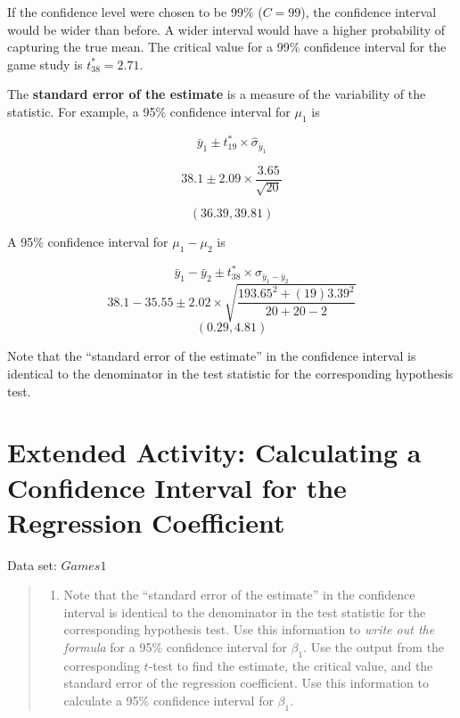 \documentclass[
]{report}
\providecommand{\tightlist}{%
  \setlength{\itemsep}{0pt}\setlength{\parskip}{0pt}}
\begin{document}
If the confidence level were chosen to be 99\% (\(C = 99\)), the confidence interval would be wider than before. A wider interval would have a higher probability of capturing the true mean. The critical value for a 99\% confidence interval for the game study is \(t^*_{38} = 2.71\).

The \textbf{standard error of the estimate} is a measure of the variability of the statistic. For example, a 95\% confidence interval for \(\mu_1\) is

\[
\bar{y}_1 \pm t^*_{19} \times \hat{\sigma}_{\bar{y}_1}
\]

\[
38.1 \pm 2.09 \times \frac{3.65}{\sqrt{20}}
\]

\[
(36.39, 39.81)
\]

A 95\% confidence interval for \(\mu_1 - \mu_2\) is

\[
\bar{y}_1 - \bar{y}_2 \pm t^*_{38} \times \hat{\sigma}_{\bar{y}_1 - \bar{y}_2}
\]
\[
38.1 - 35.55 \pm 2.02 \times \sqrt{ \frac{193.65^2 + (19)3.39^2}{20 + 20 - 2} }
\]
\[
(0.29, 4.81)
\]

Note that the ``standard error of the estimate'' in the confidence interval is identical to the denominator in the test statistic for the corresponding hypothesis test.

\hypertarget{extended-activity-calculating-a-confidence-interval-for-the-regression-coefficient}{%
\section*{Extended Activity: Calculating a Confidence Interval for the Regression Coefficient}\label{extended-activity-calculating-a-confidence-interval-for-the-regression-coefficient}}

Data set: \(Games1\)

\begin{quote}
\begin{enumerate}
\def\labelenumi{\arabic{enumi}.}
\setcounter{enumi}{39}
\tightlist
\item
  Note that the ``standard error of the estimate'' in the confidence interval is identical to the denominator in the test statistic for the corresponding hypothesis test. Use this information to \emph{write out the formula} for a 95\% confidence interval for \(\beta_1\). Use the output from the corresponding \(t\)-test to find the estimate, the critical value, and the standard error of the regression coefficient. Use this information to calculate a 95\% confidence interval for \(\beta_1\).
\end{enumerate}
\end{quote}
\end{document}
